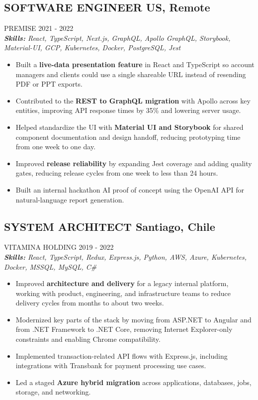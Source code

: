 \documentclass{article}
\newcommand{\WorkExperience}[2]{
   \subsection*{#1}
   \vspace{-1em}
   \uppercase{#2}
}
\newcommand{\Skills}[1]{
   \textit{\textbf{Skills:} #1}
}
\begin{document}
\WorkExperience{SOFTWARE ENGINEER \hfill US, Remote}{Premise \hfill 2021 {-} 2022} \\
\Skills{React, TypeScript, Next.js, GraphQL, Apollo GraphQL, Storybook, Material-UI, GCP, Kubernetes, Docker, PostgreSQL, Jest}
\begin{itemize}
\item Built a \textbf{live-data presentation feature} in React and TypeScript so account managers and clients could use a single shareable URL instead of resending PDF or PPT exports.
\item Contributed to the \textbf{REST to GraphQL migration} with Apollo across key entities, improving API response times by 35\% and lowering server usage.
\item Helped standardize the UI with \textbf{Material UI and Storybook} for shared component documentation and design handoff, reducing prototyping time from one week to one day.
\item Improved \textbf{release reliability} by expanding Jest coverage and adding quality gates, reducing release cycles from one week to less than 24 hours.
\item Built an internal hackathon AI proof of concept using the OpenAI API for natural-language report generation.
\end{itemize}

\WorkExperience{SYSTEM ARCHITECT \hfill Santiago, Chile}{Vitamina Holding \hfill 2019 {-} 2022} \\
\Skills{React, TypeScript, Redux, Express.js, Python, AWS, Azure, Kubernetes, Docker, MSSQL, MySQL, C\#}
\begin{itemize}
\item Improved \textbf{architecture and delivery} for a legacy internal platform, working with product, engineering, and infrastructure teams to reduce delivery cycles from months to about two weeks.
\item Modernized key parts of the stack by moving from ASP.NET to Angular and from .NET Framework to .NET Core, removing Internet Explorer-only constraints and enabling Chrome compatibility.
\item Implemented transaction-related API flows with Express.js, including integrations with Transbank for payment processing use cases.
\item Led a staged \textbf{Azure hybrid migration} across applications, databases, jobs, storage, and networking.
\end{itemize}
\end{document}
